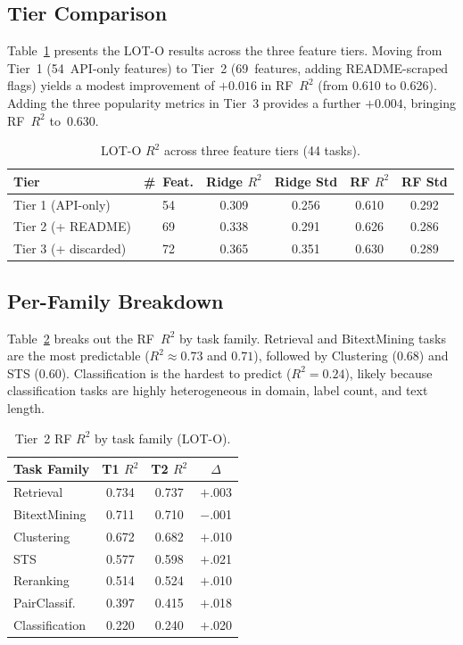 \documentclass[11pt,a4paper,twocolumn]{article}
\begin{document}
\subsection{Tier Comparison}

Table~\ref{tab:tier_results} presents the LOT-O results across the three feature tiers.
Moving from Tier~1 (54~API-only features) to Tier~2 (69~features, adding README-scraped flags) yields a modest improvement of $+0.016$ in RF~$R^2$ (from 0.610 to 0.626).
Adding the three popularity metrics in Tier~3 provides a further $+0.004$, bringing RF~$R^2$ to~0.630.

\begin{table}[t]
\centering
\caption{LOT-O $R^2$ across three feature tiers (44 tasks).}
\label{tab:tier_results}
\begin{tabular}{lccccc}
\toprule
Tier & \#~Feat. & Ridge $R^2$ & Ridge Std & RF $R^2$ & RF Std \\
\midrule
Tier 1 (API-only)    & 54 & 0.309 & 0.256 & 0.610 & 0.292 \\
Tier 2 (+ README)    & 69 & 0.338 & 0.291 & 0.626 & 0.286 \\
Tier 3 (+ discarded) & 72 & 0.365 & 0.351 & 0.630 & 0.289 \\
\bottomrule
\end{tabular}
\end{table}

\subsection{Per-Family Breakdown}

Table~\ref{tab:family_results} breaks out the RF~$R^2$ by task family.
Retrieval and BitextMining tasks are the most predictable ($R^2 \approx 0.73$ and $0.71$), followed by Clustering (0.68) and STS (0.60).
Classification is the hardest to predict ($R^2 = 0.24$), likely because classification tasks are highly heterogeneous in domain, label count, and text length.

\begin{table}[H]
\centering
\small
\caption{Tier~2 RF $R^2$ by task family (LOT-O).}
\label{tab:family_results}
\begin{tabular}{lccc}
\toprule
Task Family & T1 $R^2$ & T2 $R^2$ & $\Delta$ \\
\midrule
Retrieval       & 0.734 & 0.737 & $+$.003 \\
BitextMining    & 0.711 & 0.710 & $-$.001 \\
Clustering      & 0.672 & 0.682 & $+$.010 \\
STS             & 0.577 & 0.598 & $+$.021 \\
Reranking       & 0.514 & 0.524 & $+$.010 \\
PairClassif.    & 0.397 & 0.415 & $+$.018 \\
Classification  & 0.220 & 0.240 & $+$.020 \\
\bottomrule
\end{tabular}
\end{table}
\end{document}
